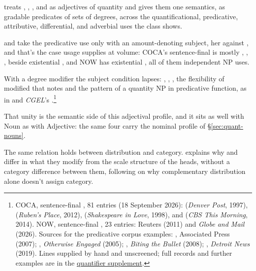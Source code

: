 \documentclass[12pt]{article}
\begin{document}
\textcite{solt2015qadjectives} treats , , , and  as adjectives of quantity and gives them one semantics, as gradable predicates of sets of degrees, across the quantificational, predicative, attributive, differential, and adverbial uses the class shows.

 and  take the predicative use only with an amount-denoting subject, her  against , and that's the case usage supplies at volume: COCA's sentence-final  is mostly , , , beside existential , and NOW has existential , all of them independent NP uses.

With a degree modifier the subject condition lapses: , , , the flexibility of modified  that \textcite{reynolds2024why} notes and the pattern of a quantity NP in predicative function, as in  and \textit{CGEL}'s  \citep[395]{huddleston2002}.\footnote{COCA, sentence-final , 81 entries (18 September 2026):  (\textit{Denver Post}, 1997),  (\textit{Ruben's Place}, 2012),  (\textit{Shakespeare in Love}, 1998), and  (\textit{CBS This Morning}, 2014). NOW, sentence-final , 23 entries: Reuters (2011) and \textit{Globe and Mail} (2026). Sources for the predicative corpus examples: , Associated Press (2007); , \textit{Otherwise Engaged} (2005); , \textit{Biting the Bullet} (2008); , \textit{Detroit News} (2019). Lines supplied by hand and unscreened; full records and further examples are in the \href{run:quantifier-controls.pdf}{quantifier supplement}.}

That unity is the semantic side of this adjectival profile, and it sits as well with Noun as with Adjective: the same four carry the nominal profile of §\ref{sec:quant-nouns}.

The same relation holds between distribution and category. \textcite{reynolds2024why} explains why  and  differ in what they modify from the scale structure of the heads, without a category difference between them, following \textcite[61]{payne2010} on why complementary distribution alone doesn't assign category.
\end{document}

